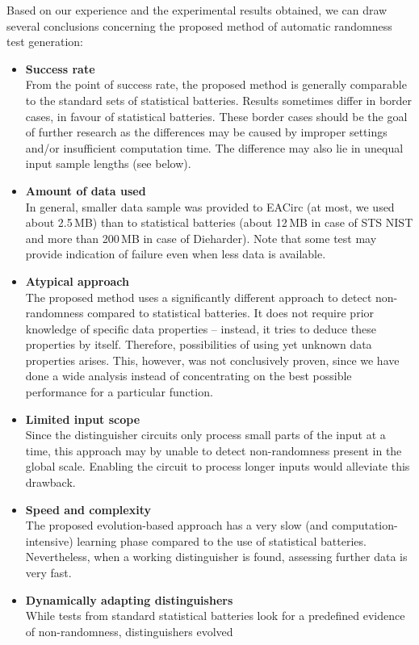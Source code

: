 \documentclass[12pt,twoside]{fithesis2}		%
\renewcommand{\_}{\leavevmode \kern0.0em\vbox{\hrule width0.4em}}
\newcommand{\squarebullet}{\textcolor{black}{\raisebox{0.15em}{\rule{4pt}{4pt}}}}
\newenvironment{myItemize}{
  \begin{itemize}[leftmargin=2em,rightmargin=1em,itemsep=\parskip ,parsep=0em,topsep=0em,partopsep=0em]
  \renewcommand{\labelitemi}{\squarebullet}
  \renewcommand{\labelitemii}{$\diamond$}
}{
  \end{itemize}
}
\begin{document}
Based on our experience and the experimental results obtained, we can draw several conclusions concerning the proposed
method of automatic randomness test generation:
\begin{myItemize}
\item \textbf{Success rate}\\
From the point of success rate, the proposed method is generally comparable to the standard sets of statistical batteries.
Results sometimes differ in border cases, in favour of statistical batteries.
These border cases should be the goal of further research as the differences may
be caused by improper settings and/or insufficient computation time. The difference may also lie in unequal input sample lengths
(see below).
\item \textbf{Amount of data used}\\
In general, smaller data sample was provided to EACirc (at most, we used about 2.5\,MB) than to statistical batteries
(about 12\,MB in case of STS NIST and more than 200\,MB in case of Dieharder). Note that some test may provide indication
of failure even when less data is available.
\item \textbf{Atypical approach}\\
The proposed method uses a significantly different approach to detect non-randomness compared to statistical batteries.
It does not require prior knowledge of specific data properties -- instead, it tries to deduce these properties by itself.
Therefore, possibilities of using yet unknown data properties arises. This, however, was not conclusively proven, 
since we have done a wide analysis instead of concentrating on the best possible performance for a particular function.
\item \textbf{Limited input scope}\\
Since the distinguisher circuits only process small parts of the input at a time, this approach may by unable to detect
non-randomness present in the global scale. Enabling the circuit to process longer inputs would alleviate this drawback.
\item \textbf{Speed and complexity}\\
The proposed evolution-based approach has a very slow (and computation-intensive) 
learning phase compared to the use of statistical batteries.
Nevertheless, when a working distinguisher is found, assessing further data is very fast.
\item \textbf{Dynamically adapting distinguishers}\\
While tests from standard statistical batteries look for a predefined evidence of non-randomness, distinguishers evolved

\end{myItemize}
\end{document}
